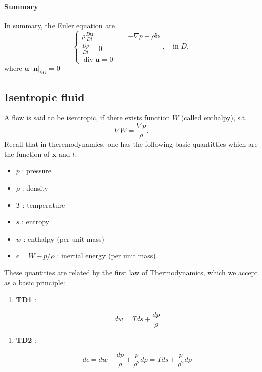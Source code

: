 \paragraph{Summary} %

In summary, the Euler equation are 
\begin{equation}
\begin{cases}
\displaystyle \rho \frac{D\textbf{u}}{Dt} &= -\nabla p + \rho \textbf{b}\\
\displaystyle \frac{D\rho}{Dt} = 0\\
\operatorname{div}\textbf{u} = 0
\end{cases},\quad \text{in $D$},
\end{equation}
where $\textbf{u}\cdot \textbf{n}\bigg|_{\partial D} = 0$

\subsection{Isentropic fluid} %

A flow is said to be isentropic, if there exists function $W$ (called enthalpy), s.t.
\begin{equation}
\nabla W = \frac{\nabla p}{\rho}.
\end{equation}
Recall that in theremodynamics, one has the following basic quantitties which are the function of $\textbf{x}$ and $t$:

\begin{itemize}
	\item $p$ : pressure
	\item $\rho$ : density
	\item $T$ : temperature
	\item $s$ : entropy
	\item $w$ : enthalpy (per unit mass)
	\item $\epsilon = W - p/\rho$ : inertial energy (per unit mass)

\end{itemize}
 These quantities are related by the first law of Thermodynamics, which we accept as a basic principle:

\begin{enumerate}
	\item \textbf{TD1} :

\begin{equation}
dw = Tds + \frac{dp}{\rho}
\end{equation}

\end{enumerate}
\begin{enumerate}
	\item \textbf{TD2} :

\begin{equation}
d\epsilon = dw - \frac{dp}{\rho} + \frac{p}{\rho^2}d\rho = Tds + \frac{p}{\rho^2}d\rho
\end{equation}

\end{enumerate}


